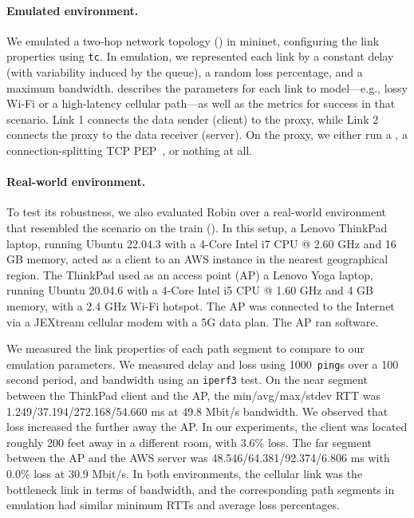 \paragraph{Emulated environment.}
We emulated a two-hop network topology () in mininet,
configuring the link properties using \texttt{tc}.
In emulation, we represented
each link by a constant delay (with variability induced by the queue), a random
loss percentage, and a maximum bandwidth.
 describes the parameters
for each link to model---e.g., lossy Wi-Fi or a high-latency cellular
path---as well as the metrics for success in that scenario.
Link 1 connects the data sender (client) to the proxy,
while Link 2 connects the proxy to the data receiver (server).
On the proxy, we either run a \sys,
a connection-splitting TCP PEP~\cite{caini2006pepsal}, or nothing at all.

\paragraph{Real-world environment.}
To test its robustness, we also evaluated Robin over a real-world
environment that resembled the scenario on the train ().
In this setup, a Lenovo ThinkPad laptop, running Ubuntu 22.04.3 with a 4-Core
Intel i7 CPU @ 2.60 GHz and 16 GB memory, acted as a client to an AWS instance in
the nearest geographical region. The ThinkPad used as an access point (AP)
a Lenovo Yoga laptop, running Ubuntu 20.04.6 with a 4-Core Intel i5 CPU @
1.60 GHz and 4 GB memory, with a 2.4 GHz Wi-Fi hotspot.
The AP was connected to the Internet via a JEXtream cellular modem
with a 5G data plan. The AP ran \sys software.

We measured the link properties of each path segment to compare to
our emulation parameters. We measured delay and loss using 1000~\texttt{ping}s
over a 100 second period, and bandwidth using an \texttt{iperf3} test.
On the near segment between the ThinkPad client and the AP,
the min/avg/max/stdev RTT was 1.249/37.194/272.168/54.660 ms
at 49.8 Mbit/s bandwidth. We observed that loss increased
the further away the AP. In our experiments, the client was located roughly
200 feet away in a different room, with 3.6\% loss.
The far segment between the AP and the AWS server was
48.546/64.381/92.374/6.806 ms with 0.0\% loss at 30.9 Mbit/s.
In both environments, the cellular link was the bottleneck link in terms of
bandwidth, and the corresponding path segments in emulation had similar
minimum RTTs and average loss percentages.

